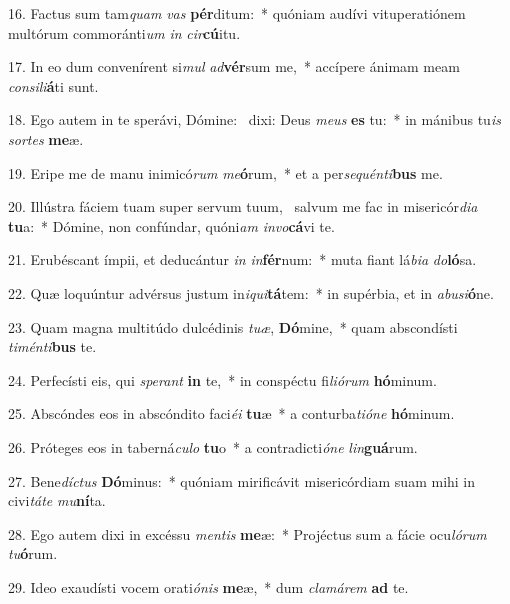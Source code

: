 16. Factus sum tam\textit{quam} \textit{vas} \textbf{pér}ditum:~*  quóniam audívi vituperatiónem multórum commoránti\textit{um} \textit{in} \textit{cir}\textbf{cú}itu.\

17. In eo dum convenírent si\textit{mul} \textit{ad}\textbf{vér}sum me,~*  accípere ánimam meam \textit{con}\textit{si}\textit{li}\textbf{á}ti sunt.\

18. Ego autem in te sperávi, Dómine: \dag\  dixi: Deus \textit{me}\textit{us} \textbf{es} tu:~*  in mánibus tu\textit{is} \textit{sor}\textit{tes} \textbf{me}æ.\

19. Eripe me de manu inimicó\textit{rum} \textit{me}\textbf{ó}rum,~*  et a per\textit{se}\textit{quén}\textit{ti}\textbf{bus} me.\

20. Illústra fáciem tuam super servum tuum, \dag\  salvum me fac in misericór\textit{di}\textit{a} \textbf{tu}a:~*  Dómine, non confúndar, quóni\textit{am} \textit{in}\textit{vo}\textbf{cá}vi te.\

21. Erubéscant ímpii, et deducántur \textit{in} \textit{in}\textbf{fér}num:~*  muta fiant lá\textit{bi}\textit{a} \textit{do}\textbf{ló}sa.\

22. Quæ loquúntur advérsus justum in\textit{i}\textit{qui}\textbf{tá}tem:~*  in supérbia, et in \textit{ab}\textit{u}\textit{si}\textbf{ó}ne.\

23. Quam magna multitúdo dulcédinis \textit{tu}\textit{æ}, \textbf{Dó}mine,~*  quam abscondísti \textit{ti}\textit{mén}\textit{ti}\textbf{bus} te.\

24. Perfecísti eis, qui \textit{spe}\textit{rant} \textbf{in} te,~*  in conspéctu fi\textit{li}\textit{ó}\textit{rum} \textbf{hó}minum.\

25. Abscóndes eos in abscóndito faci\textit{é}\textit{i} \textbf{tu}æ~*  a conturba\textit{ti}\textit{ó}\textit{ne} \textbf{hó}minum.\

26. Próteges eos in taberná\textit{cu}\textit{lo} \textbf{tu}o~*  a contradicti\textit{ó}\textit{ne} \textit{lin}\textbf{guá}rum.\

27. Bene\textit{díc}\textit{tus} \textbf{Dó}minus:~*  quóniam mirificávit misericórdiam suam mihi in civi\textit{tá}\textit{te} \textit{mu}\textbf{ní}ta.\

28. Ego autem dixi in excéssu \textit{men}\textit{tis} \textbf{me}æ:~*  Projéctus sum a fácie ocu\textit{ló}\textit{rum} \textit{tu}\textbf{ó}rum.\

29. Ideo exaudísti vocem orati\textit{ó}\textit{nis} \textbf{me}æ,~*  dum \textit{cla}\textit{má}\textit{rem} \textbf{ad} te.\


